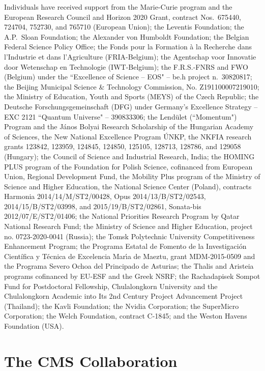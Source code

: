 \documentclass[11pt,twoside,a4paper,cmspaper,final,collab]{cms-tdr}
\begin{document}
\begin{acknowledgments}
   Individuals have received support from the Marie-Curie program and the European Research Council and Horizon 2020 Grant, contract Nos.\ 675440, 724704, 752730, and 765710 (European Union); the Leventis Foundation; the A.P.\ Sloan Foundation; the Alexander von Humboldt Foundation; the Belgian Federal Science Policy Office; the Fonds pour la Formation \`a la Recherche dans l'Industrie et dans l'Agriculture (FRIA-Belgium); the Agentschap voor Innovatie door Wetenschap en Technologie (IWT-Belgium); the F.R.S.-FNRS and FWO (Belgium) under the ``Excellence of Science -- EOS" -- be.h project n.\ 30820817; the Beijing Municipal Science \& Technology Commission, No. Z191100007219010; the Ministry of Education, Youth and Sports (MEYS) of the Czech Republic; the Deutsche Forschungsgemeinschaft (DFG) under Germany's Excellence Strategy -- EXC 2121 ``Quantum Universe" -- 390833306; the Lend\"ulet (``Momentum") Program and the J\'anos Bolyai Research Scholarship of the Hungarian Academy of Sciences, the New National Excellence Program \'UNKP, the NKFIA research grants 123842, 123959, 124845, 124850, 125105, 128713, 128786, and 129058 (Hungary); the Council of Science and Industrial Research, India; the HOMING PLUS program of the Foundation for Polish Science, cofinanced from European Union, Regional Development Fund, the Mobility Plus program of the Ministry of Science and Higher Education, the National Science Center (Poland), contracts Harmonia 2014/14/M/ST2/00428, Opus 2014/13/B/ST2/02543, 2014/15/B/ST2/03998, and 2015/19/B/ST2/02861, Sonata-bis 2012/07/E/ST2/01406; the National Priorities Research Program by Qatar National Research Fund; the Ministry of Science and Higher Education, project no. 0723-2020-0041 (Russia); the Tomsk Polytechnic University Competitiveness Enhancement Program; the Programa Estatal de Fomento de la Investigaci{\'o}n Cient{\'i}fica y T{\'e}cnica de Excelencia Mar\'{\i}a de Maeztu, grant MDM-2015-0509 and the Programa Severo Ochoa del Principado de Asturias; the Thalis and Aristeia programs cofinanced by EU-ESF and the Greek NSRF; the Rachadapisek Sompot Fund for Postdoctoral Fellowship, Chulalongkorn University and the Chulalongkorn Academic into Its 2nd Century Project Advancement Project (Thailand); the Kavli Foundation; the Nvidia Corporation; the SuperMicro Corporation; the Welch Foundation, contract C-1845; and the Weston Havens Foundation (USA).
  
\end{acknowledgments}


   
\cleardoublepage \appendix\section{The CMS Collaboration \label{app:collab}}\begin{sloppypar}\end{sloppypar}
\end{document}
